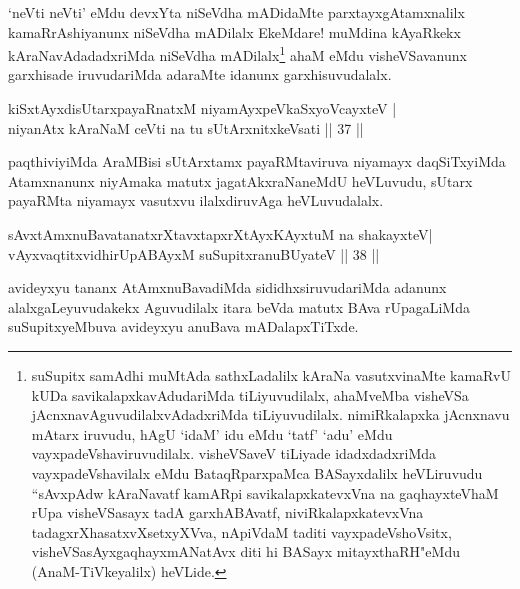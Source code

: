 \begin{artha}
`neVti neVti' eMdu devxYta niSeVdha mADidaMte parxtayxgAtamxnalilx kamaRrAshiyanunx niSeVdha mADilalx EkeMdare! muMdina kAyaRkekx kAraNavAdadadxriMda niSeVdha mADilalx\footnote[1]{suSupitx samAdhi muMtAda sathxLadalilx kAraNa vasutxvinaMte kamaRvU kUDa savikalapxkavAdudariMda tiLiyuvudilalx, ahaMveMba visheVSa jAcnxnavAguvudilalxvAdadxriMda tiLiyuvudilalx. nimiRkalapxka jAcnxnavu mAtarx iruvudu, hAgU `idaM' idu eMdu `tatf' `adu' eMdu vayxpadeVshaviruvudilalx. visheVSaveV tiLiyade idadxdadxriMda vayxpadeVshavilalx eMdu BataqRparxpaMca BASayxdalilx heVLiruvudu ``sAvxpAdw kAraNavatf kamARpi savikalapxkatevxVna na gaqhayxteV\s haM rUpa visheVSasayx tadA garxhABAvatf, niviRkalapxkatevxVna tadagxrXhasatxvXsetxyXVva, nApiVdaM taditi vayxpadeVshoV\s sitx, visheVSasAyx\s gaqhayxmANatAvx diti hi BASayx mitayxthaRH"eMdu (AnaM-TiVkeyalilx) heVLide.} ahaM eMdu visheVSavanunx garxhisade iruvudariMda adaraMte idanunx garxhisuvudalalx.
\end{artha}

\begin{shl}
kiSxtAyxdisUtarxpayaRnatxM niyamAyxpeVkaSxyoVcayxteV |\\
niyanAtx kAraNaM ceVti na tu sUtArxnitxkeV\s sati \hfill || 37 ||
\end{shl}

\begin{artha}%
paqthiviyiMda AraMBisi sUtArxtamx payaRMtaviruva niyamayx daqSiTxyiMda Atamxnanunx niyAmaka matutx jagatAkxraNaneMdU heVLuvudu, sUtarx payaRMta niyamayx vasutxvu ilalxdiruvAga heVLuvudalalx.
\end{artha}


\begin{shl}
sAvxtAmxnuBavatanatxrXtavxtapxrXtAyxKAyxtuM na shakayxteV\footnotemark[1] |\\
vAyxvaqtitxvidhirUpABAyxM \footnotemark[2]suSupitxranuBUyateV \hfill || 38 ||
\end{shl}

\begin{artha}
avideyxyu tananx AtAmxnuBavadiMda sididhxsiruvudariMda adanunx alalxgaLeyuvudakekx Aguvudilalx itara beVda matutx BAva rUpagaLiMda suSupitxyeMbuva avideyxyu anuBava mADalapxTiTxde.
\end{artha}

